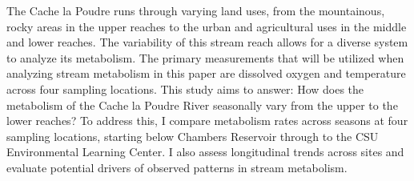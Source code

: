 \documentclass[
  letterpaper,
  DIV=11,
  numbers=noendperiod]{scrartcl}
\begin{document}
The Cache la Poudre runs through varying land uses, from the
mountainous, rocky areas in the upper reaches to the urban and
agricultural uses in the middle and lower reaches. The variability of
this stream reach allows for a diverse system to analyze its metabolism.
The primary measurements that will be utilized when analyzing stream
metabolism in this paper are dissolved oxygen and temperature across
four sampling locations. This study aims to answer: How does the
metabolism of the Cache la Poudre River seasonally vary from the upper
to the lower reaches? To address this, I compare metabolism rates across
seasons at four sampling locations, starting below Chambers Reservoir
through to the CSU Environmental Learning Center. I also assess
longitudinal trends across sites and evaluate potential drivers of
observed patterns in stream metabolism.
\end{document}
